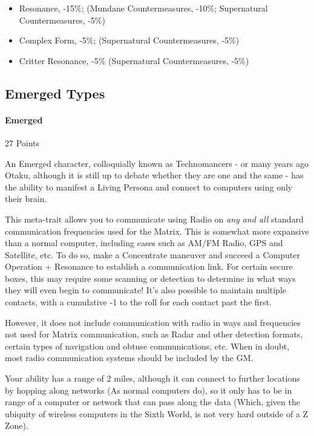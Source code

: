 \begin{multicols*}{3}
	\begin{itemize}
		\item Resonance, -15\%; (Mundane Countermeasures, -10\%; Supernatural Countermeasures, -5\%)
		\item Complex Form, -5\%; (Supernatural Countermeasures, -5\%)
		\item Critter Resonance, -5\% (Supernatural Countermeasures, -5\%)
	\end{itemize}
	
	\subsection{Emerged Types}
	
	\paragraph{Emerged}\label{emerged}
	\begin{flushright}
		27 Points
	\end{flushright}
	
	An Emerged character, colloquially known as Technomancers - or many years ago Otaku, although it is still up to debate whether they are one and the same - has the ability to manifest a Living Persona and connect to computers using only their brain.
	
	This meta-trait allows you to communicate using Radio on \textit{any and all} standard communication frequencies used for the Matrix. This is somewhat more expansive than a normal computer, including cases such as AM/FM Radio, GPS and Satellite, etc. To do so, make a Concentrate maneuver and succeed a Computer Operation + Resonance  to establish a communication link. For certain secure boxes, this may require some scanning or detection to determine in what ways they will even begin to communicate! It's also possible to maintain multiple contacts, with a cumulative -1 to the roll for each contact past the first.
	
	However, it does not include communication with radio in ways and frequencies not used for Matrix communication, such as Radar and other detection formats, certain types of navigation and obtuse communications, etc. When in doubt, most radio communication systems should be included by the GM.
	
	Your ability has a range of 2 miles, although it can connect to further locations by hopping along networks (As normal computers do), so it only has to be in range of a computer or network that can pass along the data (Which, given the ubiquity of wireless computers in the Sixth World, is not very hard outside of a Z Zone).
	

\end{multicols*}
